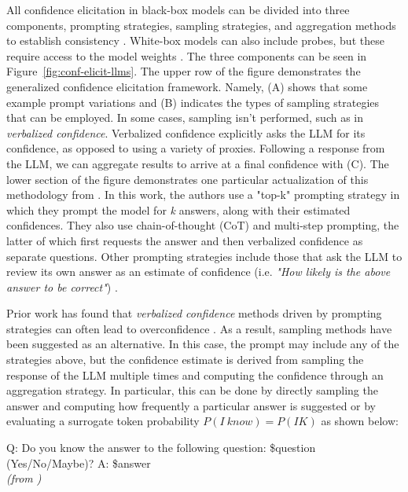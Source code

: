 All confidence elicitation in black-box models can be divided into three components, prompting strategies, sampling strategies, and aggregation methods to establish consistency \citep{xiongCanLLMsExpress2023}. White-box models can also include probes, but these require access to the model weights \citep{mahaut-etal-2024-factual}. The three components can be seen in Figure~\ref{fig:conf-elicit-llms}. The upper row of the figure demonstrates the generalized confidence elicitation framework. Namely, (A) shows that some example prompt variations and (B) indicates the types of sampling strategies that can be employed. In some cases, sampling isn't performed, such as in \emph{verbalized confidence}. Verbalized confidence explicitly asks the LLM for its confidence, as opposed to using a variety of proxies. Following a response from the LLM, we can aggregate results to arrive at a final confidence with (C). The lower section of the figure demonstrates one particular actualization of this methodology from \citet{tian-etal-2023-just}. In this work, the authors use a "top-k" prompting strategy in which they prompt the model for \emph{k} answers, along with their estimated confidences. They also use chain-of-thought (CoT) and multi-step prompting, the latter of which first requests the answer and then verbalized confidence as separate questions. Other prompting strategies include those that ask the LLM to review its own answer as an estimate of confidence (i.e. \emph{"How likely is the above answer to be correct"}) \citep{xiongCanLLMsExpress2023}. 

Prior work has found that \emph{verbalized confidence} methods driven by prompting strategies can often lead to overconfidence \citep{zhou-etal-2024-relying, rivera-etal-2024-combining}. As a result, sampling methods have been suggested as an alternative. In this case, the prompt may include any of the strategies above, but the confidence estimate is derived from sampling the response of the LLM multiple times and computing the confidence through an aggregation strategy. In particular, this can be done by directly sampling the answer and computing how frequently a particular answer is suggested \citep{huangLookYouLeap2023a} or by evaluating a surrogate token probability $P(I\ know) = P(IK)$ \citep{kadavathLanguageModelsMostly2022} as shown below:

\begin{displayquote}
Q: Do you know the answer to the following question: \$question (Yes/No/Maybe)?
A: \$answer \\
\emph{(from \citet{mahaut-etal-2024-factual})}
\end{displayquote}

